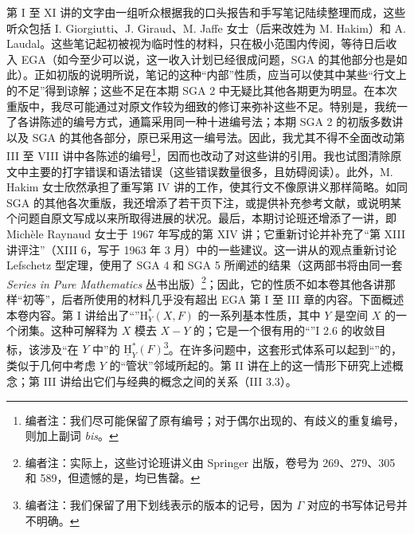 第 I 至 XI 讲的文字由一组听众根据我的口头报告和手写笔记陆续整理而成，这些听众包括 I. Giorgiutti、J. Giraud、M. Jaffe 女士（后来改姓为 M. Hakim）和 A. Laudal。这些笔记起初被视为临时性的材料，只在极小范围内传阅，等待日后收入 EGA（如今至少可以说，这一收入计划已经很成问题，SGA 的其他部分也是如此）。正如初版的说明所说，笔记的这种“内部”性质，应当可以使其中某些“行文上的不足”得到谅解；这些不足在本期 SGA 2 中无疑比其他各期更为明显。在本次重版中，我尽可能通过对原文作较为细致的修订来弥补这些不足。特别是，我统一了各讲陈述的编号方式，通篇采用同一种十进编号法；本期 SGA 2 的初版多数讲以及 SGA 的其他各部分，原已采用这一编号法。因此，我尤其不得不全面改动第 III 至 VIII 讲中各陈述的编号\footnote[1]{编者注：我们尽可能保留了原有编号；对于偶尔出现的、有歧义的重复编号，则加上副词 \textit{bis}。}，因而也改动了对这些讲的引用。我也试图清除原文中主要的打字错误和语法错误（这些错误数量很多，且妨碍阅读）。此外，M. Hakim 女士欣然承担了重写第 IV 讲的工作，使其行文不像原讲义那样简略。如同 SGA 的其他各次重版，我还增添了若干页下注，或提供补充参考文献，或说明某个问题自原文写成以来所取得进展的状况。最后，本期讨论班还增添了一讲，即 Michèle Raynaud 女士于 1967 年写成的第 XIV 讲；它重新讨论并补充了“第 XIII 讲评注”（XIII 6，写于 1963 年 3 月）中的一些建议。这一讲从的观点重新讨论 Lefschetz 型定理，使用了 SGA 4 和 SGA 5 所阐述的结果（这两部书将由同一套 \textit{Series in Pure Mathematics} 丛书出版）\footnote[2]{编者注：实际上，这些讨论班讲义由 Springer 出版，卷号为 269、279、305 和 589，但遗憾的是，均已售罄。}；因此，它的性质不如本卷其他各讲那样“初等”，后者所使用的材料几乎没有超出 EGA 第 I 至 III 章的内容。下面概述本卷内容。第 I 讲给出了“”$\mathrm{H}^{*}_{Y}(X,F)$ 的一系列基本性质，其中 $Y$ 是空间 $X$ 的一个闭集。这种可解释为 $X$ 模去 $X-Y$ 的；它是一个很有用的“”I 2.6 的收敛目标，该涉及“在 $Y$ 中”的 $\underline{\mathrm{H}}^{*}_{Y}(F)$\footnote[3]{编者注：我们保留了用下划线表示的版本的记号，因为 $\Gamma$ 对应的书写体记号并不明确。}。在许多问题中，这套形式体系可以起到“”的，类似于几何中考虑 $Y$ 的“管状”邻域所起的。第 II 讲在上的这一情形下研究上述概念；第 III 讲给出它们与经典的概念之间的关系（III 3.3）。

